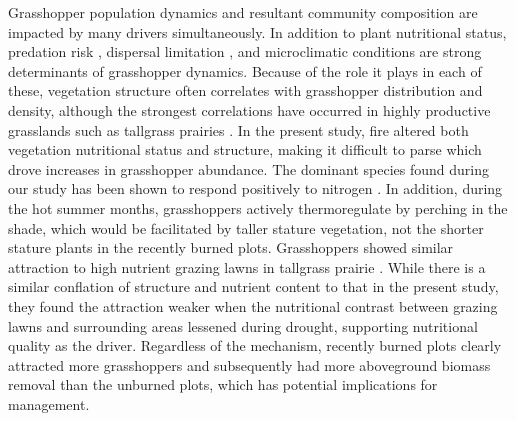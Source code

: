 \documentclass[referee, 
	            sn-basic]
           {sn-jnl}
\begin{document}
\begin{linenumbers}
Grasshopper population dynamics and resultant community composition are impacted by many drivers simultaneously. In addition to plant nutritional status, predation risk \citep{schmitz1997}, dispersal limitation \citep{hawlena2010}, and microclimatic conditions \citep{bauer2007, gardiner2008} are strong determinants of grasshopper dynamics. Because of the role it plays in each of these, vegetation structure often correlates with grasshopper distribution and density, although the strongest correlations have occurred in highly productive grasslands such as tallgrass prairies \citep{joern2004}. In the present study, fire altered both vegetation nutritional status and structure, making it difficult to parse which drove increases in grasshopper abundance. The dominant species found during our study has been shown to respond positively to nitrogen \citep{branson2003}. In addition, during the hot summer months, grasshoppers actively thermoregulate by perching in the shade, which would be facilitated by taller stature vegetation, not the shorter stature plants in the recently burned plots. Grasshoppers showed similar attraction to high nutrient grazing lawns in tallgrass prairie \citep{ozment2021}. While there is a similar conflation of structure and nutrient content to that in the present study, they found the attraction weaker when the nutritional contrast between grazing lawns and surrounding areas lessened during drought, supporting nutritional quality as the driver. Regardless of the mechanism, recently burned plots clearly attracted more grasshoppers and subsequently had more aboveground biomass removal than the unburned plots, which has potential implications for management. 



\end{linenumbers}
\end{document}
